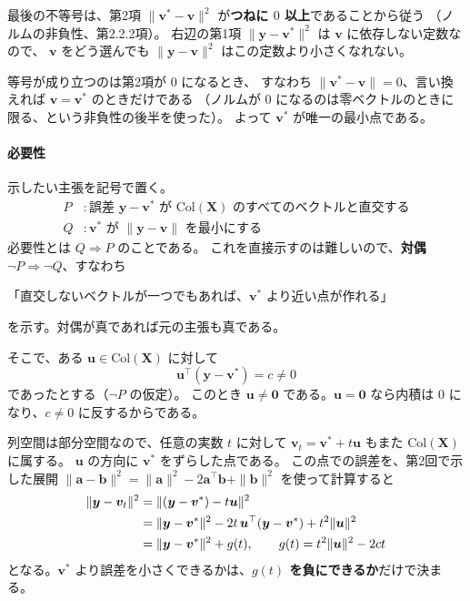 最後の不等号は、第2項 $\|\bm{v}^* - \bm{v}\|^2$ が\textbf{つねに $0$ 以上}であることから従う
（ノルムの非負性、第2.2.2項）。
右辺の第1項 $\|\bm{y} - \bm{v}^*\|^2$ は $\bm{v}$ に依存しない定数なので、
$\bm{v}$ をどう選んでも $\|\bm{y} - \bm{v}\|^2$ はこの定数より小さくなれない。

等号が成り立つのは第2項が $0$ になるとき、
すなわち $\|\bm{v}^* - \bm{v}\| = 0$、言い換えれば $\bm{v} = \bm{v}^*$ のときだけである
（ノルムが $0$ になるのは零ベクトルのときに限る、という非負性の後半を使った）。
よって $\bm{v}^*$ が唯一の最小点である。

\paragraph{必要性}
示したい主張を記号で置く。
\begin{align*}
  P &: \text{誤差 $\bm{y} - \bm{v}^*$ が $\mathrm{Col}(\bm{X})$ のすべてのベクトルと直交する} \\
  Q &: \text{$\bm{v}^*$ が $\|\bm{y} - \bm{v}\|$ を最小にする}
\end{align*}
必要性とは $Q \Rightarrow P$ のことである。
これを直接示すのは難しいので、\textbf{対偶} $\lnot P \Rightarrow \lnot Q$、すなわち
\begin{center}
「直交しないベクトルが一つでもあれば、$\bm{v}^*$ より近い点が作れる」
\end{center}
を示す。対偶が真であれば元の主張も真である。

\medskip
そこで、ある $\bm{u} \in \mathrm{Col}(\bm{X})$ に対して
\begin{equation*}
  \bm{u}^\top(\bm{y} - \bm{v}^*) = c \neq 0
\end{equation*}
であったとする（$\lnot P$ の仮定）。
このとき $\bm{u} \neq \bm{0}$ である。$\bm{u} = \bm{0}$ なら内積は $0$ になり、$c \neq 0$ に反するからである。

列空間は部分空間なので、任意の実数 $t$ に対して
$\bm{v}_t = \bm{v}^* + t\bm{u}$ もまた $\mathrm{Col}(\bm{X})$ に属する。
$\bm{u}$ の方向に $\bm{v}^*$ をずらした点である。
この点での誤差を、第2回で示した展開
$\|\bm{a}-\bm{b}\|^2 = \|\bm{a}\|^2 - 2\bm{a}^\top\bm{b} + \|\bm{b}\|^2$ を使って計算すると
\begin{align}
  \|\bm{y} - \bm{v}_t\|^2
    &= \|(\bm{y} - \bm{v}^*) - t\bm{u}\|^2 \notag \\
    &= \|\bm{y} - \bm{v}^*\|^2 - 2t\,\bm{u}^\top(\bm{y} - \bm{v}^*) + t^2\|\bm{u}\|^2 \notag \\
    &= \|\bm{y} - \bm{v}^*\|^2 + g(t),
      \qquad g(t) = t^2\|\bm{u}\|^2 - 2ct
  \label{eq:ch4-necessity}
\end{align}
となる。$\bm{v}^*$ より誤差を小さくできるかは、\textbf{$g(t)$ を負にできるか}だけで決まる。

